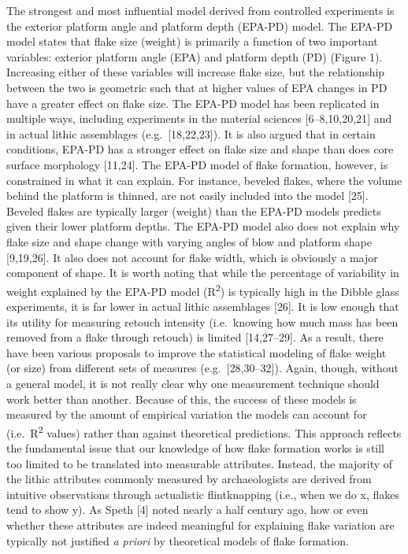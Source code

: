 \documentclass[10pt,letterpaper]{article}
\begin{document}
The strongest and most influential model derived from controlled
experiments is the exterior platform angle and platform depth (EPA-PD)
model. The EPA-PD model states that flake size (weight) is primarily a
function of two important variables: exterior platform angle (EPA) and
platform depth (PD) (Figure 1). Increasing either of these variables
will increase flake size, but the relationship between the two is
geometric such that at higher values of EPA changes in PD have a greater
effect on flake size. The EPA-PD model has been replicated in multiple
ways, including experiments in the material sciences {[}6--8,10,20,21{]}
and in actual lithic assemblages (e.g.~{[}18,22,23{]}). It is also
argued that in certain conditions, EPA-PD has a stronger effect on flake
size and shape than does core surface morphology {[}11,24{]}. The EPA-PD
model of flake formation, however, is constrained in what it can
explain. For instance, beveled flakes, where the volume behind the
platform is thinned, are not easily included into the model {[}25{]}.
Beveled flakes are typically larger (weight) than the EPA-PD models
predicts given their lower platform depths. The EPA-PD model also does
not explain why flake size and shape change with varying angles of blow
and platform shape {[}9,19,26{]}. It also does not account for flake
width, which is obviously a major component of shape. It is worth noting
that while the percentage of variability in weight explained by the
EPA-PD model (R\textsuperscript{2}) is typically high in the Dibble
glass experiments, it is far lower in actual lithic assemblages
{[}26{]}. It is low enough that its utility for measuring retouch
intensity (i.e.~knowing how much mass has been removed from a flake
through retouch) is limited {[}14,27--29{]}. As a result, there have
been various proposals to improve the statistical modeling of flake
weight (or size) from different sets of measures (e.g.~{[}28,30--32{]}).
Again, though, without a general model, it is not really clear why one
measurement technique should work better than another. Because of this,
the success of these models is measured by the amount of empirical
variation the models can account for (i.e.~R\textsuperscript{2} values)
rather than against theoretical predictions. This approach reflects the
fundamental issue that our knowledge of how flake formation works is
still too limited to be translated into measurable attributes. Instead,
the majority of the lithic attributes commonly measured by
archaeologists are derived from intuitive observations through
actualistic flintknapping (i.e., when we do x, flakes tend to show y).
As Speth {[}4{]} noted nearly a half century ago, how or even whether
these attributes are indeed meaningful for explaining flake variation
are typically not justified \emph{a priori} by theoretical models of
flake formation.
\end{document}
